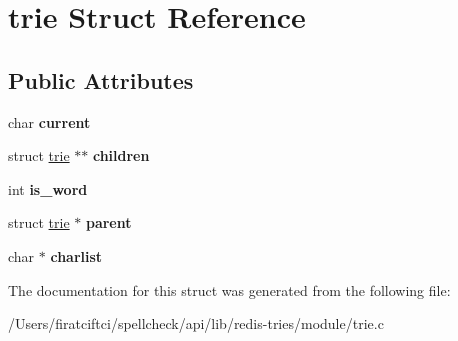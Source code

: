 \hypertarget{structtrie}{}\section{trie Struct Reference}
\label{structtrie}
\subsection*{Public Attributes}
\begin{DoxyCompactItemize}
\item 
\mbox{\label{structtrie_ae0b1f0e70e6499cf5b37e2322e30d16c}} 
char {\bfseries current}
\item 
\mbox{\label{structtrie_aef4d5c101069c280c08ed23636505079}} 
struct \mbox{\hyperlink{structtrie}{trie}} $\ast$$\ast$ {\bfseries children}
\item 
\mbox{\label{structtrie_a1aad2f91026a96305ca9489eea8c5720}} 
int {\bfseries is\+\_\+word}
\item 
\mbox{\label{structtrie_a5623bbbf793b4659b2badfadae983034}} 
struct \mbox{\hyperlink{structtrie}{trie}} $\ast$ {\bfseries parent}
\item 
\mbox{\label{structtrie_af4a9ad62a2178649f867d1ed52af2ca6}} 
char $\ast$ {\bfseries charlist}
\end{DoxyCompactItemize}


The documentation for this struct was generated from the following file\+:\begin{DoxyCompactItemize}
\item 
/\+Users/firatciftci/spellcheck/api/lib/redis-\/tries/module/trie.\+c\end{DoxyCompactItemize}
